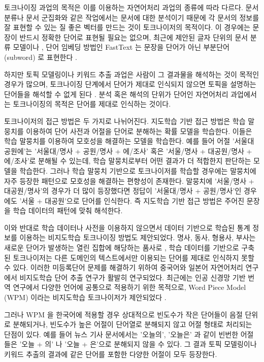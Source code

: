 \documentclass[oneside, ko,phd]{snuthesis_utf8_kor}
\begin{document}
토크나이징 과업의 목적은 이를 이용하는 자연어처리 과업의 종류에 따라 다르다.
문서 분류나 문서 군집화와 같은 작업에서는 문서에 대한 분석이기 때문에 각 문서의 정보를 잘 표현할 수 있는 질 좋은 벡터를 만드는 것이 토크나이저의 목적이다.
이 경우에는 문장이 반드시 정확한 단어로 표현될 필요는 없으며, 최근에 제안된 글자 단위의 문서 분류 모델이나 \cite{zhang2015character}, 단어 임베딩 방법인 FastText 는 문장을 단어가 아닌 부분단어 (subword) 로 표현한다 \cite{bojanowski2016enriching, joulin2016bag}.

하지만 토픽 모델링이나 키워드 추출 과업은 사람이 그 결과물을 해석하는 것이 목적인 경우가 많으며, 토크나이징 단계에서 단어가 제대로 인식되지 않으면 토픽을 설명하는 단어들을 해석할 수 없게 된다 \cite{hall2008studying}.
분석 혹은 해석의 단위가 단어인 자연어처리 과업에서는 토크나이징의 목적은 단어를 제대로 인식하는 것이다.

토크나이저의 접근 방법은 두 가지로 나뉘어진다.
지도학습 기반 접근 방법은 학습 말뭉치를 이용하여 단어 사전과 어절을 단어로 분해하는 확률 모델을 학습한다.
이들은 학습 말뭉치를 이용하여 모호성을 해결하는 모델을 학습한다.
예를 들어 어절 '서울대공원에'는 '서울대/명사 + 공원/명사 + 에/조사' 혹은 '서울/명사 + 대공원/명사 + 에/조사'로 분해될 수 있는데, 학습 말뭉치로부터 어떤 결과가 더 적합한지 판단하는 모델을 학습한다.
그러나 학습 말뭉치 기반으로 토크나이저를 학습할 경우에는 말뭉치에 자주 등장한 패턴으로 모호성을 해결하는 편향성이 존재한다.
말뭉치에 '서울/명사 + 대공원/명사'의 경우가 더 많이 등장했다면 정답이 '서울대/명사 + 공원/명사'인 경우에도 '서울 + 대공원'으로 단어를 인식한다.
즉 지도학습 기반 접근 방법은 주어진 문장을 학습 데이터의 패턴에 맞춰 해석한다.

이와 반대로 학습 데이터나 사전을 이용하지 않으면서 데이터 기반으로 학습된 통계 정보를 이용하는 비지도학습 토크나이징 방법도 제안되었다.
명사, 동사, 형용사, 부사는 새로운 단어가 발생하는 열린 집합에 해당하는 품사로 \cite{jurafsky2000speech}, 학습 데이터를 기반으로 구축된 토크나이저는 다른 도메인의 텍스트에서만 이용되는 단어를 제대로 인식하지 못할 수 있다.
이러한 미등록단어 문제를 해결하기 위하여 중국어와 일본어 자연어처리 연구에서 비지도학습 단어 추출 연구가 활발히 연구되었다.
최근에는 인공 신경망 기반 번역 연구에서 다양한 언어에 공통으로 적용하기 위한 목적으로, Word Piece Model (WPM) 이라는 비지도학습 토크나이저가 제안되었다 \cite{sennrich2015neural}.

그러나 WPM 을 한국어에 적용할 경우 상대적으로 빈도수가 작은 단어들이 음절 단위로 분해되거나, 빈도수가 높은 어절이 단어열로 분해되지 않고 어절 형태로 처리되는 단점이 있다.
예를 들어 뉴스 기사 문서에서는 '오늘의', '오늘은' 과 같이 빈번한 어절들은 '오늘 + 의' 나 '오늘 + 은'으로 분해되지 않을 수 있다.
그 결과 토픽 모델링이나 키워드 추출의 결과에 같은 단어를 포함한 다양한 어절이 모두 등장한다.
\end{document}
